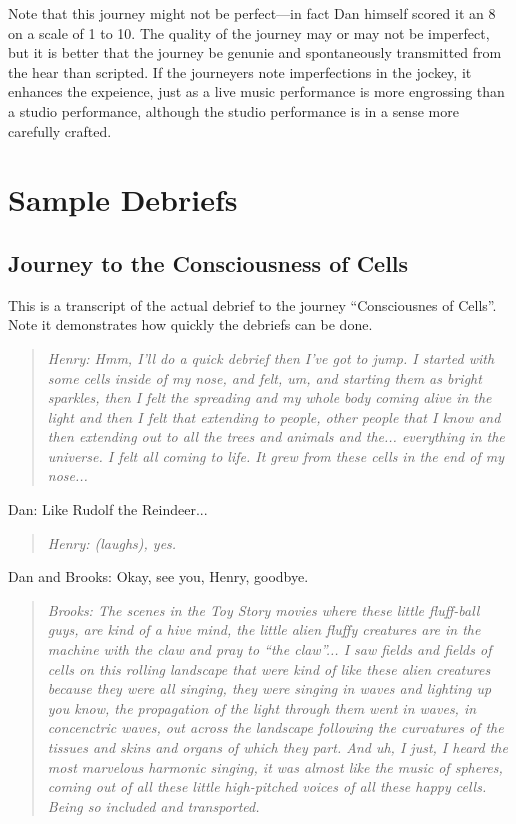 \documentclass[12pt]{book}
\begin{document}
\hrulefill

Note that this journey might not be perfect---in fact Dan himself
scored it an 8 on a scale of 1 to 10. The quality of the journey
may or may not be imperfect, but it is better that the
journey be genunie and spontaneously transmitted from the
hear than scripted. If the journeyers note imperfections
in the jockey, it enhances the expeience, just as a live
music performance is more engrossing than a studio performance,
although the studio performance is in a sense more carefully crafted.

\chapter{Sample Debriefs}

\section{Journey to the Consciousness of Cells}

This is a transcript of the actual debrief to the journey
``Consciousnes of Cells''. Note it demonstrates how
quickly the debriefs can be done.

\begin{quote}{\em
Henry: Hmm, I'll do a quick debrief then I've got to jump.
I started with some cells inside of my nose, and felt, um,
and starting them as bright sparkles, then I felt the spreading
and my whole body coming alive in the light and then I felt
that extending to people, other people that I know and
then extending out to all the trees and animals and the...
everything in the universe. I felt all coming to life.
It grew from these cells in the end of my nose...
}\end{quote}

Dan: Like Rudolf the Reindeer...

\begin{quote}{\em
Henry: (laughs), yes.
}\end{quote}    

Dan and Brooks: Okay,  see you, Henry, goodbye.


\begin{quote}{\em
Brooks:  The scenes in the Toy Story movies where these
little fluff-ball guys, are kind of a hive mind,
the little alien fluffy creatures are in the machine
with the claw and pray to ``the claw''...
I saw fields and fields of cells on this rolling landscape
that were kind of like these alien creatures because they
were all singing, they were singing in waves and lighting up
you know, the propagation of the light through them went
in waves, in concenctric waves, out across the landscape
following the curvatures of the tissues and skins and organs
of which they part. And uh, I just,  I heard the most marvelous harmonic
singing, it was almost like the music of spheres,
coming out of all these little high-pitched voices 
of all these happy cells.
Being so included and transported.
}\end{quote}
\end{document}
